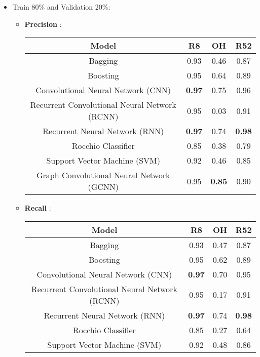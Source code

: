\begin{itemize}
    \item Train 80\% and Validation 20\%:
    \begin{itemize}
        \item \textbf{Precision} : 
            \newline
            \begin{tabular}{|c|c|c|c|}\hline
                \textbf{Model} &  \textbf{R8} & \textbf{OH} & \textbf{R52} \\\hline
                Bagging & 0.93 & 0.46 & 0.87 \\\hline
                Boosting & 0.95 & 0.64 &  0.89\\\hline
                Convolutional Neural Network (CNN) & \textbf{0.97} & 0.75 & 0.96\\\hline
                Recurrent Convolutional Neural Network (RCNN) & 0.95 & 0.03 &  0.91\\\hline
                Recurrent Neural Network (RNN) & \textbf{0.97} & 0.74  & \textbf{0.98} \\\hline
                Rocchio Classifier & 0.85 & 0.38 & 0.79 \\\hline
                Support Vector Machine (SVM) & 0.92 & 0.46 & 0.85 \\\hline
                Graph Convolutional Neural Network (GCNN) & 0.95 & \textbf{0.85} & 0.90\\\hline
            \end{tabular}
        \item \textbf{Recall} :
            \newline
            \begin{tabular}{|c|c|c|c|}\hline
                 \textbf{Model} & \textbf{R8} & \textbf{OH} & \textbf{R52} \\\hline
                Bagging & 0.93 & 0.47 & 0.87 \\\hline
                Boosting & 0.95 & 0.62 &  0.89\\\hline
                Convolutional Neural Network (CNN) & \textbf{0.97} & 0.70 & 0.95 \\\hline
                Recurrent Convolutional Neural Network (RCNN) & 0.95 & 0.17 &  0.91\\\hline
                Recurrent Neural Network (RNN) & \textbf{0.97} & 0.74 & \textbf{0.98} \\\hline
                Rocchio Classifier & 0.85 & 0.27 &  0.64\\\hline
                Support Vector Machine (SVM) & 0.92 & 0.48 &  0.86\\\hline

\end{tabular}
\end{itemize}
\end{itemize}

